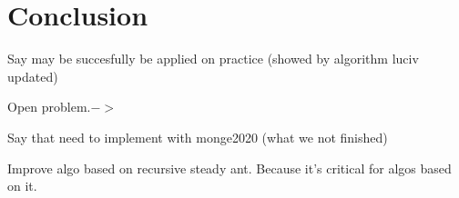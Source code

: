\section{Conclusion}
\label{section:conclusion}

Say may be succesfully be applied on practice (showed by algorithm luciv updated)


Open problem.$->$

Say that need to implement with monge2020 (what we not finished)

Improve algo based on recursive steady ant. Because it's critical for algos based on it.
